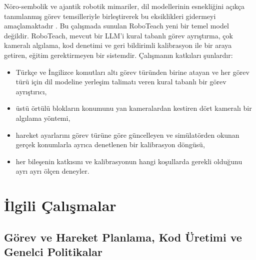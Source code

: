\documentclass[preprint,12pt]{elsarticle}
\begin{document}
Nöro-sembolik ve ajantik robotik mimariler, dil modellerinin esnekliğini açıkça tanımlanmış görev temsilleriyle birleştirerek bu eksiklikleri gidermeyi amaçlamaktadır \cite{marra2024neurosymbolic,frering2025bdi,zhao2026agentic}. Bu çalışmada sunulan RoboTeach yeni bir temel model değildir. RoboTeach, mevcut bir LLM'i kural tabanlı görev ayrıştırma, çok kameralı algılama, kod denetimi ve geri bildirimli kalibrasyon ile bir araya getiren, eğitim gerektirmeyen bir sistemdir. Çalışmanın katkıları şunlardır:

\begin{itemize}

\item
  Türkçe ve İngilizce komutları altı görev türünden birine atayan ve her görev türü için dil modeline yerleşim talimatı veren kural tabanlı bir görev ayrıştırıcı,
\item
  üstü örtülü blokların konumunu yan kameralardan kestiren dört kameralı bir algılama yöntemi,
\item
  hareket ayarlarını görev türüne göre güncelleyen ve simülatörden okunan gerçek konumlarla ayrıca denetlenen bir kalibrasyon döngüsü,
\item
  her bileşenin katkısını ve kalibrasyonun hangi koşullarda gerekli olduğunu ayrı ayrı ölçen deneyler.
\end{itemize}

\hypertarget{ilgili-uxe7alux131ux15fmalar}{%
\section{İlgili Çalışmalar}\label{ilgili-uxe7alux131ux15fmalar}}

\hypertarget{guxf6rev-ve-hareket-planlama-kod-uxfcretimi-ve-genelci-politikalar}{%
\subsection{Görev ve Hareket Planlama, Kod Üretimi ve Genelci Politikalar}\label{guxf6rev-ve-hareket-planlama-kod-uxfcretimi-ve-genelci-politikalar}}
\end{document}
